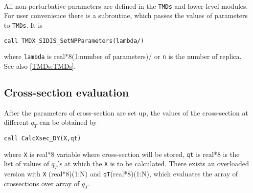 \documentclass[prd,nofootinbib,eqsecnum,final]{revtex4}
\renewcommand{\(}{\left(}
\renewcommand{\)}{\right)}
\renewcommand{\[}{\left[}
\renewcommand{\]}{\right]}
\begin{document}
~

All non-perturbative parameters are defined in the \texttt{TMDs} and lower-level modules. For user convenience there is a subroutine, which passes the values of parameters to \texttt{TMDs}. It is

\texttt{call TMDX\_SIDIS{\_}SetNPParameters(lambda/)}

where \texttt{lambda} is real*8(1:number of parameters)/ or \texttt{n} is the number of replica. See also \ref{TMDs:TMDs}. 

\subsection{Cross-section evaluation}
\label{TMDXs:xsec}

After the parameters of cross-section are set up, the values of the cross-section at different $q_T$ can be obtained by

\texttt{call CalcXsec\_DY(X,qt)}

where  \texttt{X} is real*8 variable where cross-section will be stored, \texttt{qt} is real*8 is the list of values of $q_T$'s at which the \texttt{X} is to be calculated. There exists an overloaded version with \texttt{X} (real*8)(1:N) and \texttt{qT}(real*8)(1:N), which evaluates the array of crossections over array of $q_T$.
\end{document}
